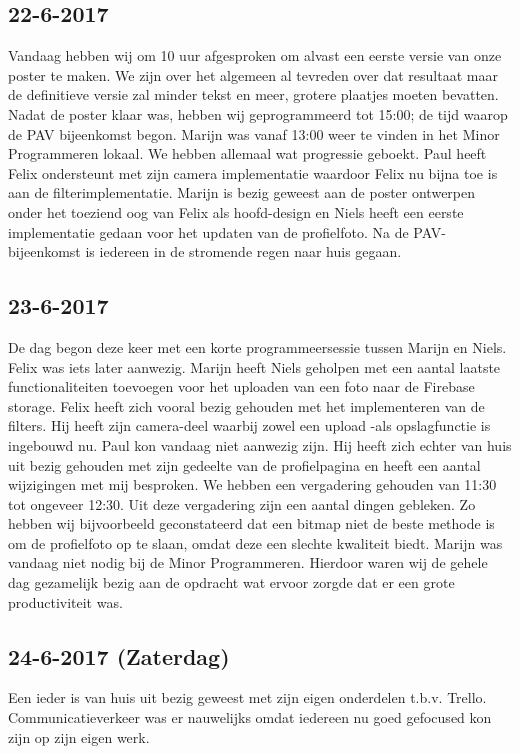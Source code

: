 \documentclass{uva-inf-article}
\begin{document}
\subsection{22-6-2017}
Vandaag hebben wij om 10 uur afgesproken om alvast een eerste versie van onze poster te maken. We zijn over het algemeen al tevreden over dat resultaat maar de definitieve versie zal minder tekst en meer, grotere plaatjes moeten bevatten.
Nadat de poster klaar was, hebben wij geprogrammeerd tot 15:00; de tijd waarop de PAV bijeenkomst begon.
Marijn was vanaf 13:00 weer te vinden in het Minor Programmeren lokaal. We hebben allemaal wat progressie geboekt. Paul heeft Felix ondersteunt met zijn camera implementatie waardoor Felix nu bijna toe is aan de filterimplementatie.
Marijn is bezig geweest aan de poster ontwerpen onder het toeziend oog van Felix als hoofd-design en Niels heeft een eerste implementatie gedaan voor het updaten van de profielfoto. Na de PAV-bijeenkomst is iedereen in de stromende regen naar huis gegaan.
\subsection{23-6-2017}
De dag begon deze keer met een korte programmeersessie tussen Marijn en Niels. Felix was iets later aanwezig. Marijn heeft Niels geholpen met een aantal laatste functionaliteiten toevoegen voor het uploaden van een foto naar de Firebase storage. Felix heeft zich vooral bezig gehouden met het implementeren van de filters. Hij heeft zijn camera-deel waarbij zowel een upload -als opslagfunctie is ingebouwd nu.
Paul kon vandaag niet aanwezig zijn. Hij heeft zich echter van huis uit bezig gehouden met zijn gedeelte van de profielpagina en heeft een aantal wijzigingen met mij besproken. We hebben een vergadering gehouden van 11:30 tot ongeveer 12:30. Uit deze vergadering zijn een aantal dingen gebleken. Zo hebben wij bijvoorbeeld geconstateerd dat een bitmap niet de beste methode is om de profielfoto op te slaan, omdat deze een slechte kwaliteit biedt.
Marijn was vandaag niet nodig bij de Minor Programmeren. Hierdoor waren wij de gehele dag gezamelijk bezig aan de opdracht wat ervoor zorgde dat er een grote productiviteit was.
\subsection{24-6-2017 (Zaterdag) }
Een ieder is van huis uit bezig geweest met zijn eigen onderdelen t.b.v. Trello. Communicatieverkeer was er nauwelijks omdat iedereen nu goed gefocused kon zijn op zijn eigen werk.
\end{document}
